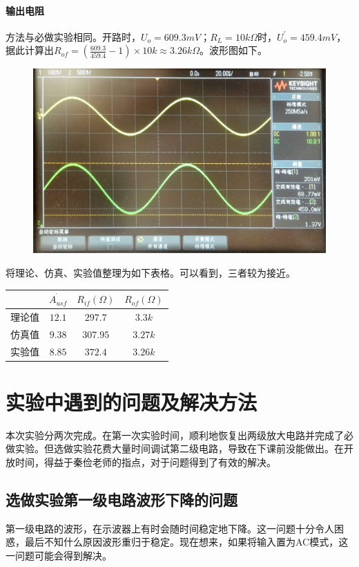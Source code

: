 \documentclass[12pt,a4paper]{article}
\begin{document}
\begin{spacing}{1.3}
\paragraph{输出电阻} 方法与必做实验相同。开路时，$U_o = 609.3mV$；$R_L = 10k\Omega 时，U_{o}^{'}=459.4mV$，据此计算出$R_{of}=(\frac{609.3}{459.4}-1)\times 10k\approx 3.26k\Omega$。波形图如下。
\begin{figure}[H]
\centering
\includegraphics[width=\textwidth]{pic4.jpg}
\end{figure}
将理论、仿真、实验值整理为如下表格。可以看到，三者较为接近。
\begin{table} [H]
\centering
\begin{tabular}{|c|c|c|c|}
\hline 
&$\dot{A_{usf}}$ &$R_{if}(\Omega)$ &$ R_{of}(\Omega)$ \\ \hline 
理论值 &$12.1 $& $297.7 $ &$ 3.3k$\\ \hline
仿真值&$9.38 $& $ 307.95$ &$ 3.27k$\\ \hline 
实验值&$8.85 $& $372.4 $ &$ 3.26k$\\ \hline
\end{tabular} 
\end{table} 
\section{实验中遇到的问题及解决方法}
本次实验分两次完成。在第一次实验时间，顺利地恢复出两级放大电路并完成了必做实验。但选做实验花费大量时间调试第二级电路，导致在下课前没能做出。在开放时间，得益于秦俭老师的指点，对于问题得到了有效的解决。
\subsection{选做实验第一级电路波形下降的问题}
第一级电路的波形，在示波器上有时会随时间稳定地下降。这一问题十分令人困惑，最后不知什么原因波形重归于稳定。现在想来，如果将输入置为AC模式，这一问题可能会得到解决。

\end{spacing}
\end{document}
